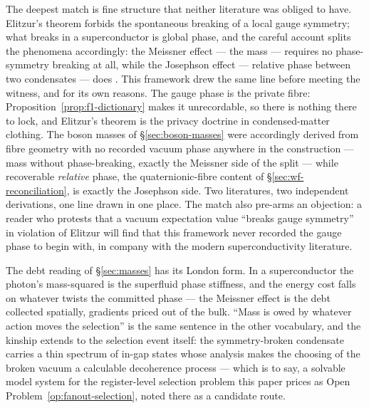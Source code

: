 The deepest match is fine structure that neither literature was obliged to have. Elitzur's theorem
forbids the spontaneous breaking of a local gauge symmetry; what breaks in a superconductor is
global phase, and the careful account splits the phenomena accordingly: the Meissner effect ---
the mass --- requires no phase-symmetry breaking at all, while the Josephson effect --- relative
phase between two condensates --- does \autocite{vanwezelvandenbrink2007ssb}. This framework drew
the same line before meeting the witness, and for its own reasons. The gauge phase is the private
fibre: Proposition~\ref{prop:f1-dictionary} makes it unrecordable, so there is nothing there to
lock, and Elitzur's theorem is the privacy doctrine in condensed-matter clothing. The boson masses
of \S\ref{sec:boson-masses} were accordingly derived from fibre geometry with no recorded vacuum
phase anywhere in the construction --- mass without phase-breaking, exactly the Meissner side of
the split --- while recoverable \emph{relative} phase, the quaternionic-fibre content of
\S\ref{sec:wf-reconciliation}, is exactly the Josephson side. Two literatures, two independent
derivations, one line drawn in one place. The match also pre-arms an objection: a reader who
protests that a vacuum expectation value ``breaks gauge symmetry'' in violation of Elitzur will
find that this framework never recorded the gauge phase to begin with, in company with the modern
superconductivity literature.

The debt reading of \S\ref{sec:masses} has its London form. In a superconductor the photon's
mass-squared is the superfluid phase stiffness, and the energy cost falls on whatever twists the
committed phase --- the Meissner effect is the debt collected spatially, gradients priced out of
the bulk. ``Mass is owed by whatever action moves the selection'' is the same sentence in the
other vocabulary, and the kinship extends to the selection event itself: the symmetry-broken
condensate carries a thin spectrum of in-gap states whose analysis makes the choosing of the
broken vacuum a calculable decoherence process \autocite{vanwezelvandenbrink2007ssb} --- which is
to say, a solvable model system for the register-level selection problem this paper prices as
Open Problem~\ref{op:fanout-selection}, noted there as a candidate route.

